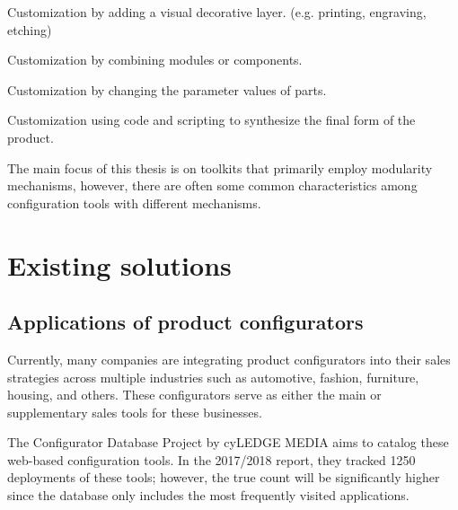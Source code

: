 \begin{definition}[Veneer]
Customization by adding a visual decorative layer. (e.g. printing, engraving, etching)
\end{definition}
\begin{definition}[Modularity]
Customization by combining modules or components.
\end{definition}
\begin{definition}[Parametric]
Customization by changing the parameter values of parts.
\end{definition}
\begin{definition}[Generative]
Customization using code and scripting to synthesize the final form of the product.
\end{definition}

The main focus of this thesis is on toolkits that primarily employ modularity mechanisms, however, there are often some common characteristics among configuration tools with different mechanisms.

\section{Existing solutions}
\subsection{Applications of product configurators}

Currently, many companies are integrating product configurators into their sales strategies across multiple industries such as automotive, fashion, furniture, housing, and others. These configurators serve as either the main or supplementary sales tools for these businesses.

The Configurator Database Project by cyLEDGE MEDIA aims to catalog these web-based configuration tools. In the 2017/2018 report, they tracked 1250 deployments of these tools; however, the true count will be significantly higher since the database only includes the most frequently visited applications. \cite{cyLEDGE2018}

